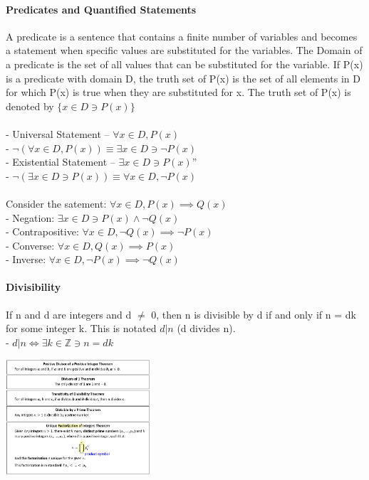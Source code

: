 \documentclass[10pt,letterpaper]{article}
\begin{document}
\begin{multicols}{2}
\paragraph*{Predicates and Quantified Statements} A predicate is a sentence that contains a finite number of variables and becomes a statement when specific values are substituted for the variables. 
The Domain of a predicate is the set of all values that can be substituted for the variable. If P(x) is a predicate with domain D, the truth set of P(x) is the set of all elements in D 
for which P(x) is true when they are substituted for x. The truth set of P(x) is denoted by $\{x \in D \ni P(x)\}$\\
\\
- Universal Statement -- $\forall x \in D, P(x)$\\
- $\neg(\forall x \in D, P(x)) \equiv \exists x \in D \ni \neg P(x)$\\
- Existential Statement -- $\exists x \in D \ni P(x)$''\\
- $\neg(\exists x \in D \ni P(x)) \equiv \forall x \in D, \neg P(x)$\\
\\
Consider the satement: $\forall x \in D, P(x) \implies Q(x)$\\
- Negation: $\exists x \in D \ni P(x) \land \neg Q(x)$\\
- Contrapositive: $\forall x \in D, \neg Q(x) \implies \neg P(x)$\\
- Converse: $\forall x \in D, Q(x) \implies P(x)$\\
- Inverse: $\forall x \in D, \neg P(x) \implies \neg Q(x)$

\paragraph*{Divisibility} If n and d are integers and d $\neq$ 0, then n is divisible by d if and only if n = dk for some integer k. This is notated $d|n$ (d divides n).\\
- $d|n \iff \exists k \in \mathbb{Z} \ni n=dk$\\
\begin{center}
    \includegraphics[width=0.4\textwidth]{divisibility-theorems.png}
\end{center}

\end{multicols}
\end{document}
